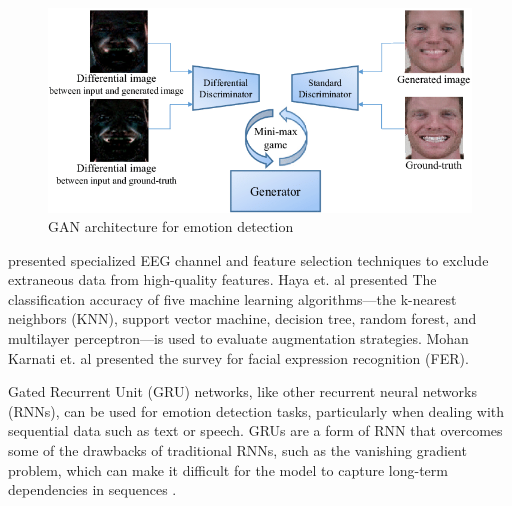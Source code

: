 \documentclass[conference]{IEEEtran}
\begin{document}
\begin{figure}
\centerline{\includegraphics[scale=0.3]{GAN.png}}
\caption{GAN architecture for emotion detection \cite{article}}
\end{figure}

\cite{aldawsari2023optimizing} presented specialized EEG channel and feature selection techniques to exclude extraneous data from high-quality features. Haya et. al \cite{hasnul2023augmenting} presented The classification accuracy of five machine learning algorithms—the k-nearest neighbors (KNN), support vector machine, decision tree, random forest, and multilayer perceptron—is used to evaluate augmentation strategies. Mohan Karnati et. al \cite{karnati2023understanding} presented the survey for facial expression recognition (FER).

Gated Recurrent Unit (GRU) networks, like other recurrent neural networks (RNNs), can be used for emotion detection tasks, particularly when dealing with sequential data such as text or speech. GRUs are a form of RNN that overcomes some of the drawbacks of traditional RNNs, such as the vanishing gradient problem, which can make it difficult for the model to capture long-term dependencies in sequences \cite{maji2023multimodal}.
\end{document}
